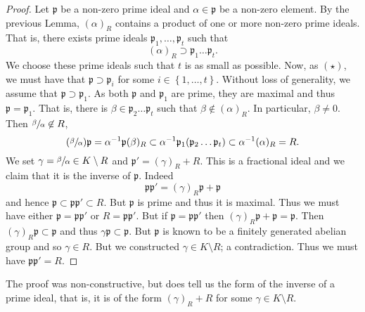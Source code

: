 
\begin{proof}
	Let $\mathfrak p$ be a non-zero prime ideal
	and $\alpha \in \mathfrak p$ be a non-zero element.
	By the previous Lemma, $(\alpha)_R$ contains a product
	of one or more non-zero prime ideals.
	That is, there exists prime ideals $\mathfrak p_1, \ldots, \mathfrak p_t$
	such that
	\[
		(\alpha)_R \supset \mathfrak p_1 \ldots \mathfrak p_t. \tag{$\star$}
	\]
	We choose these prime ideals such that $t$ is as small as possible.
	Now, as $(\star)$, we must have that $\mathfrak p \supset \mathfrak p_i$
	for some
	$
		i \in \left\{
			1, \ldots, t
		\right\}
	$.
	Without loss of generality, we assume that 
	$\mathfrak p \supset \mathfrak p_1$.
	As both $\mathfrak p$ and $\mathfrak p_1$ are prime,
	they are maximal and thus $\mathfrak p = \mathfrak p_1$.
	That is, there is
	$\beta \in \mathfrak p_2 \ldots \mathfrak p_t$
	such that 
	$\beta \not\in (\alpha)_R$.
	In particular, $\beta \neq 0$.
	Then $\sfrac{\beta}{\alpha} \not\in R$,
	\[
		(\sfrac{\beta}{\alpha}) \mathfrak p
		= \alpha^{-1} \mathfrak p (\beta)_R
		\subset \alpha^{-1} \mathfrak p_1 (\mathfrak p_2 \ldots \mathfrak p_t)
		\subset \alpha^{-1}(\alpha)_R = R.
	\]
	We set $\gamma = \sfrac{\beta}{\alpha} \in K \setminus R$
	and $\mathfrak p' = (\gamma)_R + R$.
	This is a fractional ideal and we claim that it is the inverse 
	of $\mathfrak p$.
	Indeed
	\[
		\mathfrak p \mathfrak p' = (\gamma)_R \mathfrak p + \mathfrak p
	\]
	and hence $\mathfrak p \subset \mathfrak p \mathfrak p' \subset R$.
	But $\mathfrak p$ is prime and thus it is maximal.
	Thus we must have either $\mathfrak p = \mathfrak p \mathfrak p'$
	or $R = \mathfrak p \mathfrak p'$.
	But if $\mathfrak p = \mathfrak p \mathfrak p'$
	then $(\gamma)_R \mathfrak p + \mathfrak p = \mathfrak p$.
	Then $(\gamma)_R \mathfrak p \subset \mathfrak p$
	and thus $\gamma \mathfrak p \subset \mathfrak p$.
	But $\mathfrak p$ is known to be a finitely generated abelian group
	and so $\gamma \in R$.
	But we constructed $\gamma \in K \setminus R$; a contradiction.
	Thus we must have $\mathfrak p \mathfrak p' = R$.
\end{proof}	

The proof was non-constructive, but does tell us the form of the inverse
of a prime ideal, that is, it is of the form $(\gamma)_R + R$ for some
$\gamma \in K \setminus R$.

